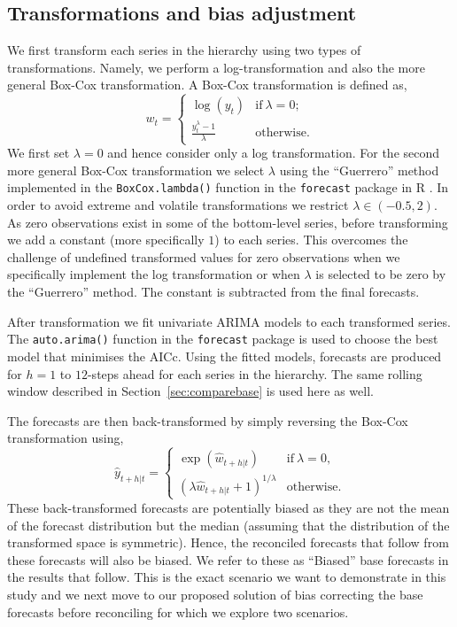 \documentclass[12pt]{article}
\theoremstyle{definition}
\begin{document}
\subsection{Transformations and bias adjustment}

We first transform each series in the hierarchy using two types of transformations. Namely, we perform a log-transformation and also the more general Box-Cox transformation. A Box-Cox transformation is defined as,
\begin{equation*}\label{eq:BoxCox_transformation}
w_t = \begin{cases}
        \log(y_t)                        & \text{if}~\lambda=0;\\
        \frac{y_t^\lambda - 1}{\lambda}  & \text{otherwise}.
      \end{cases}
\end{equation*}
We first set $\lambda=0$ and hence consider only a log transformation. For the second more general Box-Cox transformation we select $\lambda$ using the ``Guerrero'' method \citep{guerrero1993time} implemented in the \verb|BoxCox.lambda()| function in the \verb|forecast| package in R \citep{Rforecast}. In order to avoid extreme and volatile transformations we restrict $\lambda \in (-0.5,2)$. As zero observations exist in some of the bottom-level series, before transforming we add a constant (more specifically $1$) to each series. This overcomes the challenge of undefined transformed values for zero observations when we specifically implement the log transformation or when $\lambda$ is selected to be zero by the ``Guerrero'' method. The constant is subtracted from the final forecasts.

After transformation we fit univariate ARIMA models to each transformed series. The \verb|auto.arima()| function in the \verb|forecast| package is used to choose the best model that minimises the AICc. Using the fitted models, forecasts are produced for $h=1$ to $12$-steps ahead for each series in the hierarchy. The same rolling window described in Section~\ref{sec:comparebase} is used here as well.

The forecasts are then back-transformed by simply reversing the Box-Cox transformation using,
\begin{equation}\label{eq:BoxCox_back-transformation}
  \hat{y}_{t+h|t} =
    \begin{cases}
      \exp({\hat{w}_{t+h|t}})                   & \text{if}~\lambda = 0, \\
      (\lambda \hat{w}_{t+h|t} + 1)^{1/\lambda} & \text{otherwise.}
  \end{cases}
\end{equation}
These back-transformed forecasts are potentially biased as they are not the mean of the forecast distribution but the median (assuming that the distribution of the transformed space is symmetric). Hence, the reconciled forecasts that follow from these forecasts will also be biased. We refer to these as ``Biased'' base forecasts in the results that follow. This is the exact scenario we want to demonstrate in this study and we next move to our proposed solution of bias correcting the base forecasts before reconciling for which we explore two scenarios.
\end{document}
